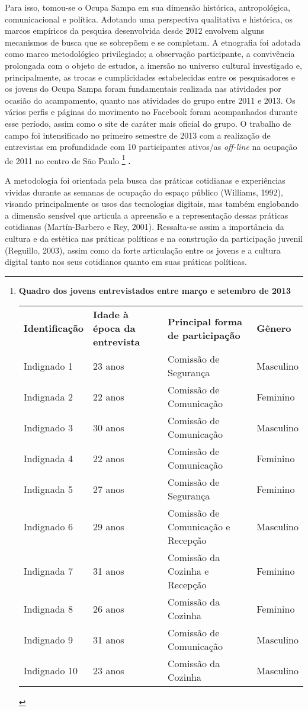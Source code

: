 Para isso, tomou-se o Ocupa Sampa em sua dimensão histórica,
antropológica, comunicacional e política. Adotando uma perspectiva
qualitativa e histórica, os marcos empíricos da pesquisa desenvolvida
desde 2012 envolvem alguns mecanismos de busca que se sobrepõem e se
completam. A etnografia foi adotada como marco metodológico
privilegiado; a observação participante, a convivência prolongada com o
objeto de estudos, a imersão no universo cultural investigado e,
principalmente, as trocas e cumplicidades estabelecidas entre os
pesquisadores e os jovens do Ocupa Sampa foram fundamentais realizada
nas atividades por ocasião do acampamento, quanto nas atividades do
grupo entre 2011 e 2013. Os vários perfis e páginas do movimento no
Facebook foram acompanhados durante esse período, assim como o site de
caráter mais oficial do grupo. O trabalho de campo foi intensificado no
primeiro semestre de 2013 com a realização de entrevistas em
profundidade com 10 participantes ativos/as \emph{off-line} na ocupação
de 2011 no centro de São Paulo \footnote{\textbf{Quadro dos jovens
  entrevistados entre março e setembro de 2013}

  \begin{longtable}[]{@{}llll@{}}
  \toprule
  \textbf{Identificação} & \textbf{Idade à época da entrevista} &
  \textbf{Principal forma de participação} &
  \textbf{Gênero}\tabularnewline
  Indignado 1 & 23 anos & Comissão de Segurança &
  Masculino\tabularnewline
  Indignada 2 & 22 anos & Comissão de Comunicação &
  Feminino\tabularnewline
  Indignado 3 & 30 anos & Comissão de Comunicação &
  Masculino\tabularnewline
  Indignada 4 & 22 anos & Comissão de Comunicação &
  Feminino\tabularnewline
  Indignada 5 & 27 anos & Comissão de Segurança &
  Feminino\tabularnewline
  Indignado 6 & 29 anos & Comissão de Comunicação e Recepção &
  Masculino\tabularnewline
  Indignada 7 & 31 anos & Comissão da Cozinha e Recepção &
  Feminino\tabularnewline
  Indignada 8 & 26 anos & Comissão da Cozinha & Feminino\tabularnewline
  Indignado 9 & 31 anos & Comissão de Comunicação &
  Masculino\tabularnewline
  Indignado 10 & 23 anos & Comissão da Cozinha &
  Masculino\tabularnewline
  \bottomrule
  \end{longtable}} \textbf{.}

A metodologia foi orientada pela busca das práticas cotidianas e
experiências vividas durante as semanas de ocupação do espaço público
(Williams, 1992), visando principalmente os usos das tecnologias
digitais, mas também englobando a dimensão sensível que articula a
apreensão e a representação dessas práticas cotidianas (Martín-Barbero e
Rey, 2001). Ressalta-se assim a importância da cultura e da estética nas
práticas políticas e na construção da participação juvenil (Reguillo,
2003), assim como da forte articulação entre os jovens e a cultura
digital tanto nos seus cotidianos quanto em suas práticas políticas.


